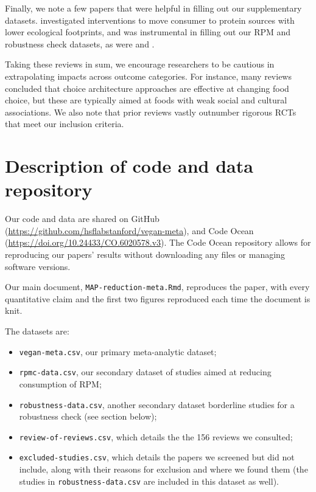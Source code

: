 \documentclass[sn-nature,referee,lineno,pdflatex]{sn-jnl}
\begin{document}
Finally, we note a few papers that were helpful in filling out our
supplementary datasets. \citep{ronto2022} investigated interventions to
move consumer to protein sources with lower ecological footprints, and
was instrumental in filling out our RPM and robustness check datasets,
as were \citep{kwasny2022} and \citep{grummon2023}.

Taking these reviews in sum, we encourage researchers to be cautious in
extrapolating impacts across outcome categories. For instance, many
reviews concluded that choice architecture approaches are effective at
changing food choice, but these are typically aimed at foods with weak
social and cultural associations. We also note that prior reviews vastly
outnumber rigorous RCTs that meet our inclusion criteria.

\section{Description of code and data
repository}\label{description-of-code-and-data-repository}

Our code and data are shared on GitHub
(\url{https://github.com/hsflabstanford/vegan-meta}), and Code Ocean
(\url{https://doi.org/10.24433/CO.6020578.v3}). The Code Ocean
repository allows for reproducing our papers' results without
downloading any files or managing software versions.

Our main document, \texttt{MAP-reduction-meta.Rmd}, reproduces the
paper, with every quantitative claim and the first two figures
reproduced each time the document is knit.

The datasets are:

\begin{itemize}
\item
  \texttt{vegan-meta.csv}, our primary meta-analytic dataset;
\item
  \texttt{rpmc-data.csv}, our secondary dataset of studies aimed at
  reducing consumption of RPM;
\item
  \texttt{robustness-data.csv}, another secondary dataset borderline
  studies for a robustness check (see section below);
\item
  \texttt{review-of-reviews.csv}, which details the the 156 reviews we
  consulted;
\item
  \texttt{excluded-studies.csv}, which details the papers we screened
  but did not include, along with their reasons for exclusion and where
  we found them (the studies in \texttt{robustness-data.csv} are
  included in this dataset as well).
\end{itemize}
\end{document}
